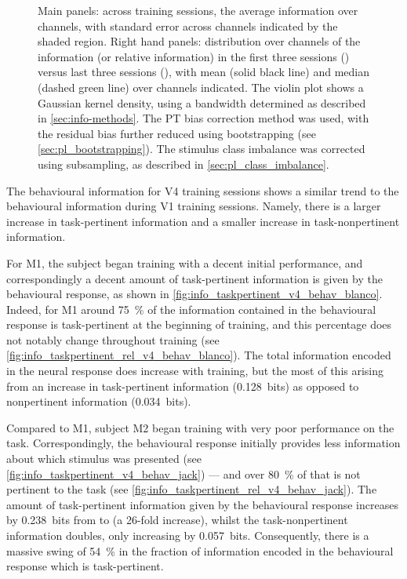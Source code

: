 \begin{figure}[htbp]
{Main panels: across training sessions, the average information over channels, with standard error across channels indicated by the shaded region.
Right hand panels: distribution over channels of the information (or relative information) in the first three sessions () versus last three sessions (), with mean (solid black line) and median (dashed green line) over channels indicated.
The violin plot shows a Gaussian kernel density, using a bandwidth determined as described in \autoref{sec:info-methods}.
The \ac{PT} bias correction method was used, with the residual bias further reduced using bootstrapping (see \autoref{sec:pl_bootstrapping}).
The stimulus class imbalance was corrected using subsampling, as described in \autoref{sec:pl_class_imbalance}.
    \label{fig:info_taskpertinent_v4_ch}
}
\end{figure}


The behavioural information for \ac{V4} training sessions shows a similar trend to the behavioural information during \ac{V1} training sessions.
Namely, there is a larger increase in task-pertinent information and a smaller increase in task-nonpertinent information.

For \ac{M1}, the subject began training with a decent initial performance, and correspondingly a decent amount of task-pertinent information is given by the behavioural response, as shown in \autoref{fig:info_taskpertinent_v4_behav_blanco}.
Indeed, for \ac{M1} around \SI{75}{\percent} of the information contained in the behavioural response is task-pertinent at the beginning of training, and this percentage does not notably change throughout training (see \autoref{fig:info_taskpertinent_rel_v4_behav_blanco}).
The total information encoded in the neural response does increase with training, but the most of this arising from an increase in task-pertinent information (\SI{+0.128}{bits}) as opposed to nonpertinent information (\SI{+0.034}{bits}).

Compared to \ac{M1}, subject \ac{M2} began training with very poor performance on the task.
Correspondingly, the behavioural response initially provides less information about which stimulus was presented (see \autoref{fig:info_taskpertinent_v4_behav_jack}) --- and over \SI{80}{\percent} of that is not pertinent to the task (see \autoref{fig:info_taskpertinent_rel_v4_behav_jack}).
The amount of task-pertinent information given by the behavioural response increases by \SI{0.238}{bits} from  to  (a 26-fold increase), whilst the task-nonpertinent information doubles, only increasing by \SI{0.057}{bits}.
Consequently, there is a massive swing of \SI{+54}{\percent} in the fraction of information encoded in the behavioural response which is task-pertinent.


